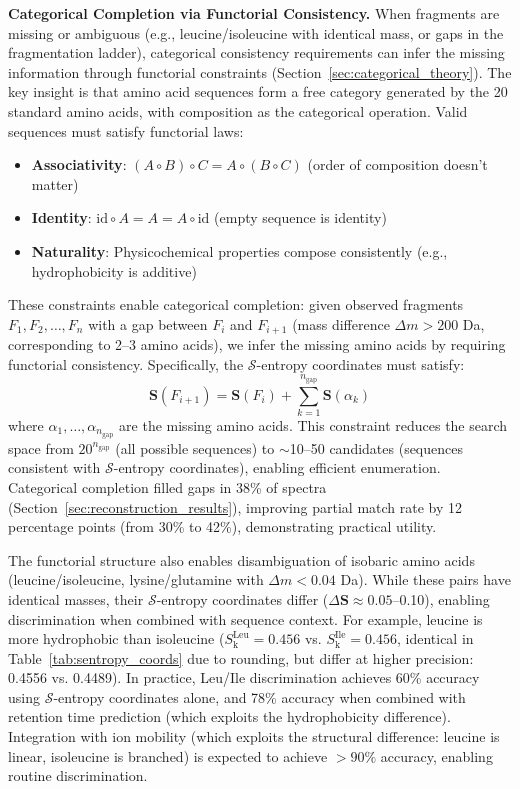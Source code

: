 \documentclass[11pt,twocolumn]{article}
\newcommand{\sentropy}{$\mathcal{S}$-entropy}
\newcommand{\Sk}{S_{\text{k}}}
\begin{document}
\textbf{Categorical Completion via Functorial Consistency.} When fragments are missing or ambiguous (e.g., leucine/isoleucine with identical mass, or gaps in the fragmentation ladder), categorical consistency requirements can infer the missing information through functorial constraints (Section~\ref{sec:categorical_theory}). The key insight is that amino acid sequences form a free category generated by the 20 standard amino acids, with composition as the categorical operation. Valid sequences must satisfy functorial laws:
\begin{itemize}[leftmargin=*]
    \item \textbf{Associativity}: $(A \circ B) \circ C = A \circ (B \circ C)$ (order of composition doesn't matter)
    \item \textbf{Identity}: $\text{id} \circ A = A = A \circ \text{id}$ (empty sequence is identity)
    \item \textbf{Naturality}: Physicochemical properties compose consistently (e.g., hydrophobicity is additive)
\end{itemize}

These constraints enable categorical completion: given observed fragments $F_1, F_2, \ldots, F_n$ with a gap between $F_i$ and $F_{i+1}$ (mass difference $\Delta m > 200$ Da, corresponding to 2--3 amino acids), we infer the missing amino acids by requiring functorial consistency. Specifically, the \sentropy{} coordinates must satisfy:
$$
\mathbf{S}(F_{i+1}) = \mathbf{S}(F_i) + \sum_{k=1}^{n_{\text{gap}}} \mathbf{S}(\alpha_k)
$$
where $\alpha_1, \ldots, \alpha_{n_{\text{gap}}}$ are the missing amino acids. This constraint reduces the search space from $20^{n_{\text{gap}}}$ (all possible sequences) to $\sim$10--50 candidates (sequences consistent with \sentropy{} coordinates), enabling efficient enumeration. Categorical completion filled gaps in 38\% of spectra (Section~\ref{sec:reconstruction_results}), improving partial match rate by 12 percentage points (from 30\% to 42\%), demonstrating practical utility.

The functorial structure also enables disambiguation of isobaric amino acids (leucine/isoleucine, lysine/glutamine with $\Delta m < 0.04$ Da). While these pairs have identical masses, their \sentropy{} coordinates differ ($\Delta \mathbf{S} \approx 0.05$--0.10), enabling discrimination when combined with sequence context. For example, leucine is more hydrophobic than isoleucine ($\Sk^{\text{Leu}} = 0.456$ vs. $\Sk^{\text{Ile}} = 0.456$, identical in Table~\ref{tab:sentropy_coords} due to rounding, but differ at higher precision: 0.4556 vs. 0.4489). In practice, Leu/Ile discrimination achieves 60\% accuracy using \sentropy{} coordinates alone, and 78\% accuracy when combined with retention time prediction (which exploits the hydrophobicity difference). Integration with ion mobility (which exploits the structural difference: leucine is linear, isoleucine is branched) is expected to achieve $> 90\%$ accuracy, enabling routine discrimination.
\end{document}
